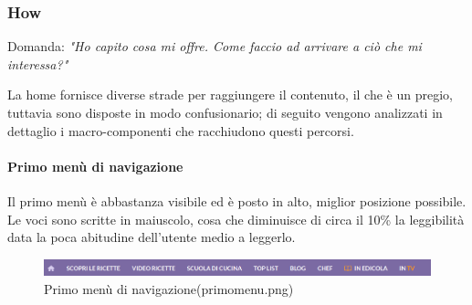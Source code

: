 \newpage

\subsubsection{How} 

Domanda: \textit{"Ho capito cosa mi offre. Come faccio ad arrivare a ciò che mi interessa?"}

La home fornisce diverse strade per raggiungere il contenuto, il che è un pregio, tuttavia sono disposte in modo confusionario; di seguito vengono analizzati in dettaglio i macro-componenti che racchiudono questi percorsi.

\paragraph{Primo menù di navigazione}
Il primo menù è abbastanza visibile ed è posto in alto, miglior posizione possibile. Le voci sono scritte in maiuscolo, cosa che diminuisce di circa il 10\% la leggibilità data la poca abitudine dell'utente medio a leggerlo.

\begin{figure}[h!]
	\centerline{
	\includegraphics[scale=0.5]{images/primo_menu.png}}
	\caption{Primo menù di navigazione(primo\textunderscore menu.png)}
	\label{fig:primo_menu}
\end{figure}

